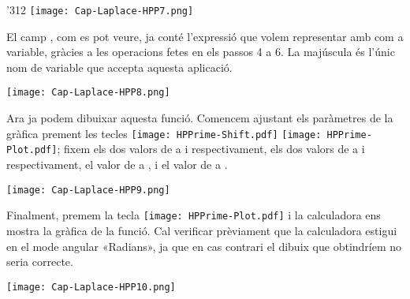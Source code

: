 \begin{exemple}[\CircuitLaplaceNul{}]
\begin{dingautolist}{'312}
            \texttt{[image: Cap-Laplace-HPP7.png]}\vspace{5mm}

          \item El camp  , com es pot veure, ja conté l'expressió que volem representar amb   com a variable, gràcies a les operacions fetes en els passos 4 a 6. La  majúscula és l'únic nom de variable que accepta aquesta aplicació.

            \texttt{[image: Cap-Laplace-HPP8.png]}\vspace{5mm}

          \item Ara ja podem dibuixar aquesta funció. Comencem ajustant els paràmetres de la gràfica prement les tecles \texttt{[image: HPPrime-Shift.pdf]} \texttt{[image: HPPrime-Plot.pdf]}; fixem els dos valors de  a  i  respectivament, els dos valors de  a  i  respectivament, el valor de  a , i el valor de  a .

            \texttt{[image: Cap-Laplace-HPP9.png]}\vspace{5mm}

          \item Finalment, premem la tecla \texttt{[image: HPPrime-Plot.pdf]} i la calculadora ens mostra la gràfica de la funció. Cal verificar prèviament que la calculadora estigui en el mode angular «Radians», ja que en cas contrari el dibuix que obtindríem no seria correcte.

            \texttt{[image: Cap-Laplace-HPP10.png]}

    \end{dingautolist}

\end{exemple}
